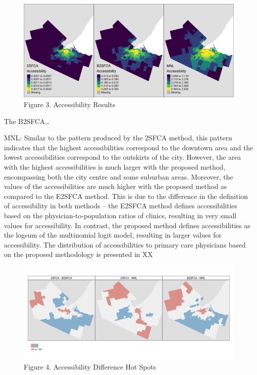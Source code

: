 \documentclass{article}
\begin{document}
\begin{figure}
\includegraphics[width=1\linewidth]{./img/Fig_3} \caption{Figure 3. Accessibility Results}\label{fig:fig 3}
\end{figure}

The B2SFCA\ldots{}

MNL: Similar to the pattern produced by the 2SFCA method, this pattern
indicates that the highest accessibilities correspond to the downtown
area and the lowest accessibilities correspond to the outskirts of the
city. However, the area with the highest accessibilities is much larger
with the proposed method, encompassing both the city centre and some
suburban areas. Moreover, the values of the accessibilities are much
higher with the proposed method as compared to the E2SFCA method. This
is due to the difference in the definition of accessibility in both
methods -- the E2SFCA method defines accessibilities based on the
physician-to-population ratios of clinics, resulting in very small
values for accessibility. In contrast, the proposed method defines
accessibilities as the logsum of the multinomial logit model, resulting
in larger values for accessibility. The distribution of accessibilities
to primary care physicians based on the proposed methodology is
presented in XX

\begin{figure}
\includegraphics[width=1\linewidth]{./img/Fig_4} \caption{Figure 4. Accessibility Difference Hot Spots}\label{fig:fig 4}
\end{figure}
\end{document}
